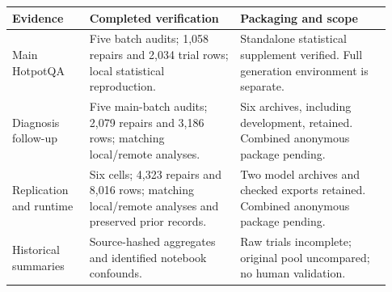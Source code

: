 \begin{tabular}{@{}>{\raggedright\arraybackslash}p{0.19\linewidth}
                  >{\raggedright\arraybackslash}p{0.37\linewidth}
                  >{\raggedright\arraybackslash}p{0.37\linewidth}@{}}
\toprule
Evidence & Completed verification & Packaging and scope \\
\midrule
Main HotpotQA & Five batch audits; 1,058 repairs and 2,034 trial rows; local statistical reproduction. & Standalone statistical supplement verified. Full generation environment is separate. \\
Diagnosis follow-up & Five main-batch audits; 2,079 repairs and 3,186 rows; matching local/remote analyses. & Six archives, including development, retained. Combined anonymous package pending. \\
Replication and runtime & Six cells; 4,323 repairs and 8,016 rows; matching local/remote analyses and preserved prior records. & Two model archives and checked exports retained. Combined anonymous package pending. \\
Historical summaries & Source-hashed aggregates and identified notebook confounds. & Raw trials incomplete; original pool uncompared; no human validation. \\
\bottomrule
\end{tabular}
